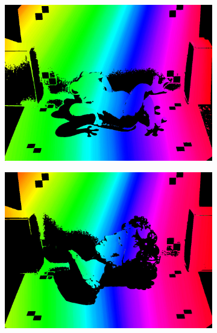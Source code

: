 \documentclass[10pt]{article}
\begin{document}
\begin{figure}[h!]
  \centering

    \begin{subfigure}[b]{0.32\linewidth}
           \centering
            \includegraphics[width=\linewidth]{frog/temporalImg.jpg}
    \end{subfigure}
    \begin{subfigure}[b]{0.32\linewidth}
           \centering
            \includegraphics[width=\linewidth]{chiquita/temporalImg.jpg}
    \end{subfigure}
    \begin{subfigure}[b]{0.32\linewidth}
           \centering

\end{subfigure}
\end{figure}
\end{document}
